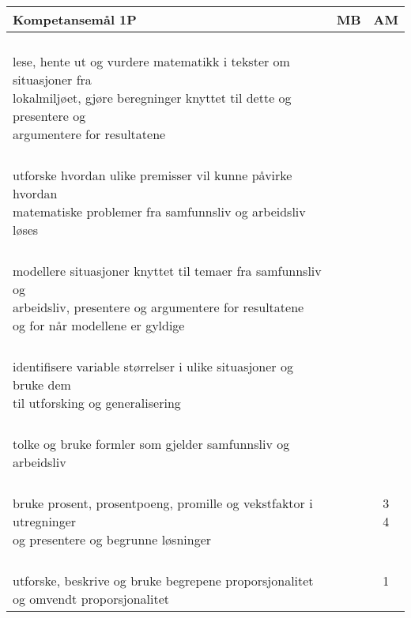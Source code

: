 \documentclass{article}
\begin{document}
\begin{center}
	\begin{tabular}{p{10.5cm} | c | c |} 
		\textbf{Kompetansemål 1P} & \textbf{MB} & \textbf{AM}\\ \hline
		\shortstack[l]{\\ lese, hente ut og vurdere matematikk i tekster om situasjoner fra \\lokalmiljøet, gjøre beregninger knyttet til dette og presentere og\\ argumentere for resultatene
		} &\shortstack{} &\shortstack{} \\ \hline
		
		\shortstack[l]{\\ utforske hvordan ulike premisser vil kunne påvirke hvordan \\matematiske problemer fra samfunnsliv og arbeidsliv løses
		} &\shortstack{} &\shortstack{} \\ \hline
		
		\shortstack[l]{\\ modellere situasjoner knyttet til temaer fra samfunnsliv og \\arbeidsliv, presentere og argumentere for resultatene\\ og for når modellene er gyldige
		} &\shortstack{} &\shortstack{} \\ \hline
		
		\shortstack[l]{\\ identifisere variable størrelser i ulike situasjoner og bruke dem \\til utforsking og generalisering
		} &\shortstack{10} &\shortstack{alle} \\ \hline
		
		\shortstack[l]{\\ tolke og bruke formler som gjelder samfunnsliv og arbeidsliv
		} &\shortstack{} &\shortstack{alle} \\ \hline
		
		\shortstack[l]{\\ bruke prosent, prosentpoeng, promille og vekstfaktor i utregninger \\og presentere og begrunne løsninger
		} &\shortstack{} &\shortstack{3\\4} \\ \hline
		
		\shortstack[l]{\\ utforske, beskrive og bruke begrepene proporsjonalitet\\ og omvendt proporsjonalitet
		} &\shortstack{} &\shortstack{1\\{}} \\ \hline
		

\end{tabular}
\end{center}
\end{document}
